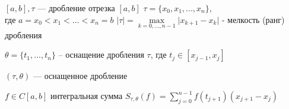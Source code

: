 \begin{definition}
    $[a, b], \tau $ --- дробление отрезка $[a, b]$ $\tau = \{ x_0, x_1, ..., x_n \}$, \\
    где $a = x_0 < x_1 < ... < x_n = b$ \quad $|\tau|
    = \max\limits_{k = 0, ..., n - 1} \lvert x_{k + 1} - x_k \rvert$ - мелкость (ранг) дробления

    $\theta = \{ t_1, ..., t_n\}$ -- оснащение дробления $\tau$, где $t_j \in [x_{j - 1}, x_j]$

    $(\tau, \theta) $ --- оснащенное дробление

    $f \in C[a, b]$ интегральная сумма $S_{\tau, \theta} (f) = \sum\limits_{j = 0}^{n - 1} f(t_{j + 1}) (x_{j + 1} - x_j)$
\end{definition}



\quad


 
